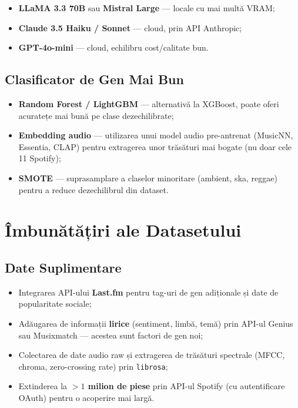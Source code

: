 \documentclass[12pt,a4paper]{report}
\begin{document}
\begin{itemize}[noitemsep]
    \item \textbf{LLaMA 3.3 70B} sau \textbf{Mistral Large} — locale cu mai multă VRAM;
    \item \textbf{Claude 3.5 Haiku / Sonnet} — cloud, prin API Anthropic;
    \item \textbf{GPT-4o-mini} — cloud, echilibru cost/calitate bun.
\end{itemize}

\subsection{Clasificator de Gen Mai Bun}

\begin{itemize}[noitemsep]
    \item \textbf{Random Forest / LightGBM} — alternativă la XGBoost, poate oferi
          acuratețe mai bună pe clase dezechilibrate;
    \item \textbf{Embedding audio} — utilizarea unui model audio pre-antrenat
          (MusicNN, Essentia, CLAP) pentru extragerea unor trăsături mai bogate
          (nu doar cele 11 Spotify);
    \item \textbf{SMOTE} — suprasamplare a claselor minoritare (ambient, ska,
          reggae) pentru a reduce dezechilibrul din dataset.
\end{itemize}

\section{Îmbunătățiri ale Datasetului}

\subsection{Date Suplimentare}

\begin{itemize}[noitemsep]
    \item Integrarea API-ului \textbf{Last.fm} pentru tag-uri de gen adiționale
          și date de popularitate sociale;
    \item Adăugarea de informații \textbf{lirice} (sentiment, limbă, temă) prin
          API-ul Genius sau Musixmatch — acestea sunt factori de gen noi;
    \item Colectarea de date audio raw și extragerea de trăsături spectrale
          (MFCC, chroma, zero-crossing rate) prin \texttt{librosa};
    \item Extinderea la \textbf{$>1$ milion de piese} prin API-ul Spotify
          (cu autentificare OAuth) pentru o acoperire mai largă.
\end{itemize}
\end{document}
